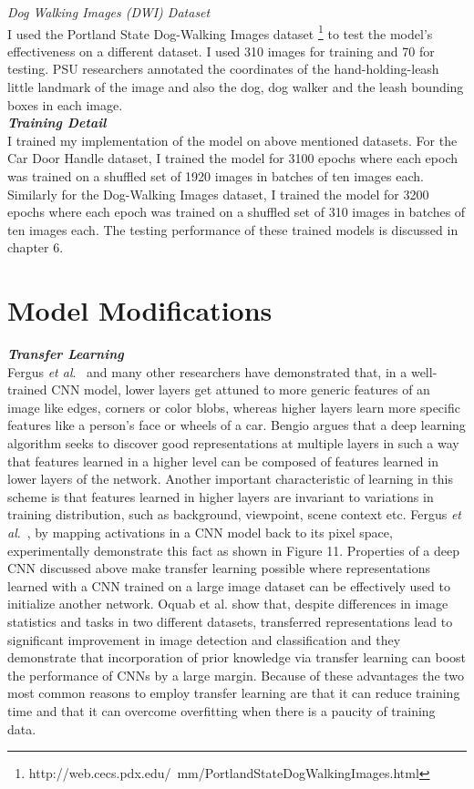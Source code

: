 \documentclass [11pt,letterpaper ,twoside ,openany ]{report}
\begin{document}
    \noindent
    \textit{Dog Walking Images (DWI) Dataset}\\
    I used the Portland State Dog-Walking Images dataset \footnote {http://web.cecs.pdx.edu/~mm/PortlandStateDogWalkingImages.html} to test the model's effectiveness on a different dataset. I used 310 images for training and 70 for testing. PSU researchers annotated the coordinates of the hand-holding-leash little landmark of the image and also the dog, dog walker and the leash bounding boxes in each image.\\

    \noindent
    \textbf{\textit{Training Detail}}\\
    I trained my implementation of the model on above mentioned datasets. For the Car Door Handle dataset, I trained the model for 3100 epochs where each epoch was trained on a shuffled set of 1920 images in batches of ten images each. Similarly for the Dog-Walking Images dataset, I trained the model for 3200 epochs where each epoch was trained on a shuffled set of 310 images in batches of ten images each. The testing performance of these trained models is discussed in chapter 6.

    \section{Model Modifications}

    \noindent
    \textbf{\textit{Transfer Learning}}\\
    Fergus \textit {et al}.\ \cite{zeiler2014visualizing} and many other researchers \cite{bengio2012deep, oquab2014learning} have demonstrated that, in a well-trained CNN model, lower layers get attuned to more generic features of an image like edges, corners or color blobs, whereas higher layers learn more specific features like a person's face or wheels of a car. Bengio \cite{bengio2012deep} argues that a deep learning algorithm seeks to discover good representations at multiple layers  in such a way that features learned in a higher level can be composed of features learned in lower layers of the network. Another important characteristic of learning in this scheme is that features learned in higher layers are invariant to variations in training distribution, such as background, viewpoint, scene context etc. Fergus \textit{et al}.\ \cite{zeiler2014visualizing}, by mapping activations in a CNN model back to its pixel space, experimentally demonstrate this fact as shown in Figure 11. Properties of a deep CNN discussed above make transfer learning possible where representations learned with a CNN trained on a large image dataset can be effectively used to  initialize another network. Oquab et al. \cite{oquab2014learning} show that, despite differences in image statistics and tasks in two different datasets, transferred representations lead to significant improvement in image detection and classification and they demonstrate that incorporation of prior knowledge via transfer learning can boost the performance of CNNs by a large margin. Because of these advantages the two most common reasons to employ transfer learning are that it can reduce training time and that it can overcome overfitting when there is a paucity of training data.
\end{document}
